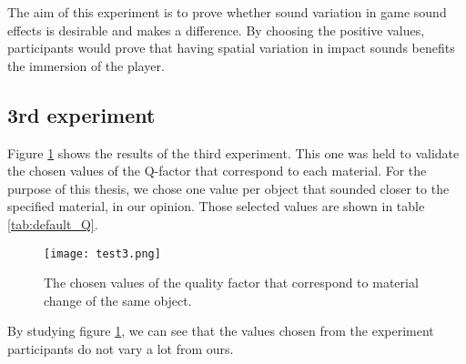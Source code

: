 The aim of this experiment is to prove whether sound variation in game sound effects is desirable and makes a difference. By choosing the positive values, participants would prove that having spatial variation in impact sounds benefits the immersion of the player. 

\subsection{3rd experiment}

Figure \ref{fig:test3} shows the results of the third experiment. This one was held to validate the chosen values of the Q-factor that correspond to each material. For the purpose of this thesis, we chose one value per object that sounded closer to the specified material, in our opinion. Those selected values are shown in table \ref{tab:default_Q}.   

\begin{figure}[H]
  \centering
    \texttt{[image: test3.png]}
      \caption{The chosen values of the quality factor that correspond to material change of the same object.}\label{fig:test3}
\end{figure}

By studying figure \ref{fig:test3}, we can see that the values chosen from the experiment participants do not vary a lot from ours.